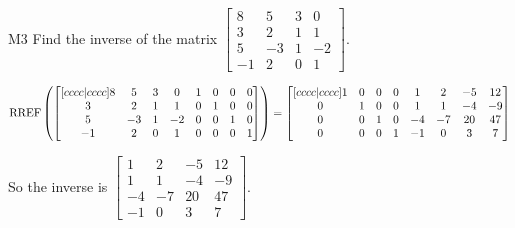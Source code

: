 \documentclass{sbgLAquiz}
\begin{document}
\begin{extract}\newpage\end{extract}
\begin{problem}{M3}
Find the inverse of the matrix $\begin{bmatrix} 8 & 5 & 3 & 0 \\ 3 & 2 & 1 & 1 \\ 5 & -3 & 1 & -2 \\ -1 & 2 & 0 & 1\end{bmatrix} $.
\end{problem}
\begin{solution}
$$\operatorname{RREF} \left(\begin{bmatrix}[cccc|cccc] 8 & 5 & 3 & 0 & 1 & 0 & 0 & 0\\ 3 & 2 & 1 & 1 & 0 & 1 & 0 & 0 \\ 5 & -3 & 1 & -2 & 0 & 0 & 1 & 0 \\ -1 & 2 & 0 & 1 & 0 & 0 & 0 & 1 \end{bmatrix} \right) = \begin{bmatrix}[cccc|cccc] 1 & 0 & 0 & 0 & 1 & 2 & -5 & 12 \\ 0 &  1 & 0 & 0 & 1 & 1 & -4 & -9 \\ 0 & 0 & 1 & 0 & -4 & -7 & 20 & 47 \\ 0 & 0 & 0 & 1 & -1 & 0 & 3 & 7 \end{bmatrix}$$

So the inverse is $\begin{bmatrix} 1 & 2 & -5 & 12 \\  1 & 1 & -4 & -9 \\  -4 & -7 & 20 & 47 \\-1 & 0 & 3 & 7 \end{bmatrix}$.
\end{solution}
\end{document}
